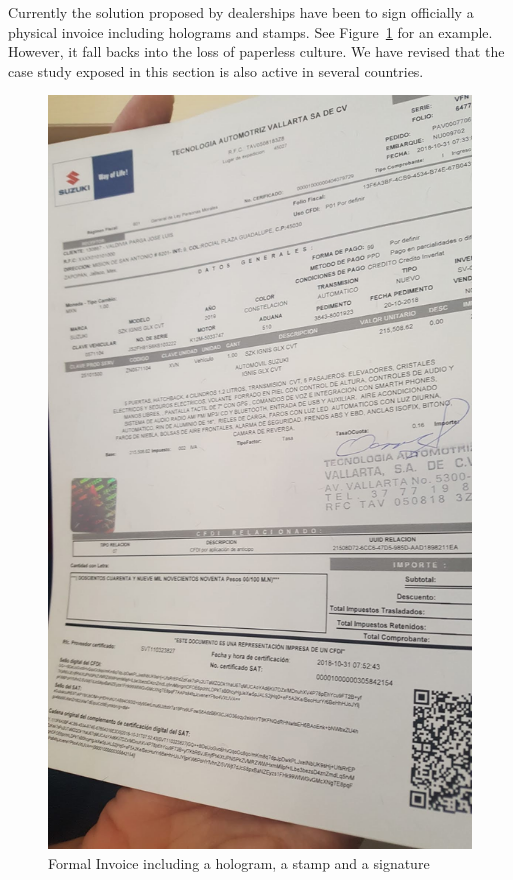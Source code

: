Currently the solution proposed by dealerships have been to sign officially a physical invoice 
including holograms and stamps. See Figure~\ref{fig:invoice} for an example. 
However, it fall backs into the loss of paperless culture. We have revised that the case 
study exposed in this section is also active in several countries.
\begin{figure}[hbt]
  \centering
    \includegraphics[scale=0.1]{images/invoice.jpg}
        \caption{Formal Invoice including a hologram, a stamp and a signature}
    \label{fig:invoice}
\end{figure}

